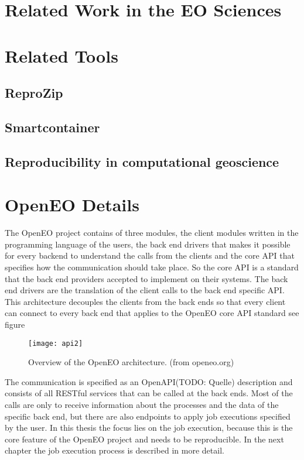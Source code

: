 \documentclass[draft,final]{vutinfth} %
\begin{document}
\section{Related Work in the EO Sciences}

\section{Related Tools}
\subsection{ReproZip}
\subsection{Smartcontainer}
\subsection{Reproducibility in computational geoscience}

\section{OpenEO Details}
The OpenEO project contains of three modules, the client modules written in the programming language of the users, the back end drivers that makes it possible for every backend to understand the calls from the clients and the core API that specifies how the communication should take place. So the core API is a standard that the back end providers accepted to implement on their systems. The back end drivers are the translation of the client calls to the back end specific API. This architecture decouples the clients from the back ends so that every client can connect to every back end that applies to the OpenEO core API standard see figure %

\begin{figure}[h]
	\centering
	\texttt{[image: api2]}
	\caption{Overview of the OpenEO architecture. (from openeo.org)}
	\label{fig:intro} %
\end{figure}


The communication is specified as an OpenAPI(TODO: Quelle) description and consists of all RESTful services that can be called at the back ends. Most of the calls are only to receive information about the processes and the data of the specific back end, but there are also endpoints to apply job executions specified by the user. In this thesis the focus lies on the job execution, because this is the core feature of the OpenEO project and needs to be reproducible. In the next chapter the job execution process is described in more detail. 
\end{document}
